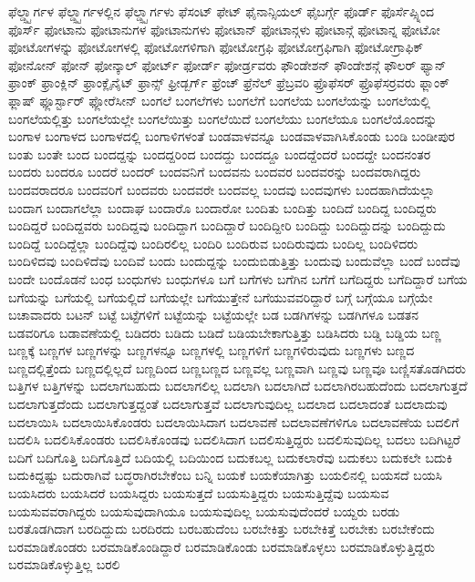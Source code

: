 {ಫೆಲ್ಡ್ಸ್ಟಾರ್ಗಳ
ಫೆಲ್ಡ್ಸ್ಟಾರ್ಗಳಲ್ಲಿನ
ಫೆಲ್ಡ್ಸ್ಟಾರ್ಗಳು
ಫೆಸಂಟ್
ಫೇಟ್
ಫೈನಾನ್ಸಿಯಲ್
ಫೈಬರ್ಗ್ಗೆ
ಫೊರ್ಡ್
ಫೊರ್ಸೆಪ್ಸ್ನಿಂದ
ಫೊರ್ಸ್
ಫೋಟಾನು
ಫೋಟಾನುಗಳ
ಫೋಟಾನುಗಳು
ಫೋಟಾನ್
ಫೋಟಾನ್ಗಳು
ಫೋಟಾನ್ಗೆ
ಫೋಟಾನ್ನ
ಫೋಟೋ
ಫೋಟೋಗಳನ್ನು
ಫೋಟೋಗಳಲ್ಲಿ
ಫೋಟೋಗಳಿಗಾಗಿ
ಫೋಟೋಗ್ರಫಿ
ಫೋಟೋಗ್ರಫಿಗಾಗಿ
ಫೋಟೋಗ್ರಾಫಿಕ್
ಫೋನೋನ್
ಫೋನ್
ಫೋನ್ಕಾಲ್
ಫೋರ್ಟ್
ಫೋರ್ಡ್
ಫೋರ್ಡ್ರವರು
ಫೌಂಡೇಶನ್
ಫೌಂಡೇಶನ್ಗೆ
ಫೌಲರ್
ಫ್ಯಾನ್
ಫ್ರಾಂಕ್
ಫ್ರಾಂಕ್ಲಿನ್
ಫ್ರಾಂಕ್ಲೈನೈಟ್
ಫ್ರಾನ್ಸ್
ಫ್ರೀಡ್ಬರ್ಗ್
ಫ್ರೆಂಚ್
ಫ್ರೆನೆಲ್
ಫ್ರೆಬ್ರವರಿ
ಫ್ರೊಫೆಸರ್
ಫ್ರೊಫೆಸರ್ರವರು
ಫ್ಲಾಂಕ್
ಫ್ಲಾಷ್
ಫ್ಲೂರ್ಸ್ಟಾರ್
ಫ್ಲೋರೆಸೀನ್
ಬಂಗಲೆ
ಬಂಗಲೆಗಳು
ಬಂಗಲೆಗೆ
ಬಂಗಲೆಯ
ಬಂಗಲೆಯನ್ನು
ಬಂಗಲೆಯಲ್ಲಿ
ಬಂಗಲೆಯಲ್ಲಿತ್ತು
ಬಂಗಲೆಯಲ್ಲೇ
ಬಂಗಲೆಯಿತ್ತು
ಬಂಗಲೆಯಿದೆ
ಬಂಗಲೆಯು
ಬಂಗಲೆಯೂ
ಬಂಗಲೆಯೊಂದನ್ನು
ಬಂಗಾಳ
ಬಂಗಾಳದ
ಬಂಗಾಳದಲ್ಲಿ
ಬಂಗಾಳಿಗಳಂತೆ
ಬಂಡವಾಳವನ್ನೂ
ಬಂಡವಾಳವಾಗಿಸಿಕೊಂಡು
ಬಂಡಿ
ಬಂಡೀಪುರ
ಬಂತು
ಬಂತೇ
ಬಂದ
ಬಂದದ್ದನ್ನು
ಬಂದದ್ದರಿಂದ
ಬಂದದ್ದು
ಬಂದದ್ದೂ
ಬಂದದ್ದೆಂದರೆ
ಬಂದದ್ದೇ
ಬಂದನಂತರ
ಬಂದರು
ಬಂದರೂ
ಬಂದರೆ
ಬಂದರ್
ಬಂದವನಿಗೆ
ಬಂದವನು
ಬಂದವರ
ಬಂದವರನ್ನು
ಬಂದವರಾಗಿದ್ದರು
ಬಂದವರಾದರೂ
ಬಂದವರಿಗೆ
ಬಂದವರು
ಬಂದವರೇ
ಬಂದವಲ್ಲ
ಬಂದವು
ಬಂದವುಗಳು
ಬಂದಹಾಗಿದೆಯಲ್ಲಾ
ಬಂದಾಗ
ಬಂದಾಗಲೆಲ್ಲಾ
ಬಂದಾಘ
ಬಂದಾರೊ
ಬಂದಾರೋ
ಬಂದಿತು
ಬಂದಿತ್ತು
ಬಂದಿದೆ
ಬಂದಿದ್ದ
ಬಂದಿದ್ದರು
ಬಂದಿದ್ದರೆ
ಬಂದಿದ್ದವರು
ಬಂದಿದ್ದವು
ಬಂದಿದ್ದಾಗ
ಬಂದಿದ್ದಾರೆ
ಬಂದಿದ್ದೀರಿ
ಬಂದಿದ್ದು
ಬಂದಿದ್ದುದನ್ನು
ಬಂದಿದ್ದುದು
ಬಂದಿದ್ದೆ
ಬಂದಿದ್ದೆಲ್ಲಾ
ಬಂದಿದ್ದೆವು
ಬಂದಿರಲಿಲ್ಲ
ಬಂದಿರಿ
ಬಂದಿರುವ
ಬಂದಿರುವುದು
ಬಂದಿಲ್ಲ
ಬಂದಿಳಿದರು
ಬಂದಿಳಿದವು
ಬಂದಿಳಿದೆವು
ಬಂದಿವೆ
ಬಂದು
ಬಂದುದ್ದನ್ನು
ಬಂದುಬಿಡುತ್ತಿತ್ತು
ಬಂದುವು
ಬಂದುವೆಲ್ಲಾ
ಬಂದೆ
ಬಂದೆವು
ಬಂದೇ
ಬಂದೊಡನೆ
ಬಂಧ
ಬಂಧುಗಳು
ಬಂಧುಗಳೂ
ಬಗೆ
ಬಗೆಗಳು
ಬಗೆಗಿನ
ಬಗೆಗೆ
ಬಗೆದಿದ್ದರು
ಬಗೆದಿದ್ದಾರೆ
ಬಗೆಯ
ಬಗೆಯನ್ನು
ಬಗೆಯಲ್ಲಿ
ಬಗೆಯಲ್ಲಿದೆ
ಬಗೆಯಲ್ಲೇ
ಬಗೆಯುತ್ತೇನೆ
ಬಗೆಯುವವರಿದ್ದಾರೆ
ಬಗ್ಗೆ
ಬಗ್ಗೆಯೂ
ಬಗ್ಗೆಯೇ
ಬಚಾವಾದರು
ಬಟನ್
ಬಟ್ಟೆ
ಬಟ್ಟೆಗಳಿಗೆ
ಬಟ್ಟೆಯನ್ನು
ಬಟ್ಟೆಯಲ್ಲೇ
ಬಡ
ಬಡಗಿಗಳನ್ನು
ಬಡಗಿಗಳೂ
ಬಡತನ
ಬಡವರಿಗೂ
ಬಡಾವಣೆಯಲ್ಲಿ
ಬಡಿದರು
ಬಡಿದು
ಬಡಿದೆ
ಬಡಿಯಬೇಕಾಗುತ್ತಿತ್ತು
ಬಡಿಸಿದರು
ಬಡ್ಡಿ
ಬಡ್ಡಿಯ
ಬಣ್ಣ
ಬಣ್ಣಕ್ಕೆ
ಬಣ್ಣಗಳ
ಬಣ್ಣಗಳನ್ನು
ಬಣ್ಣಗಳನ್ನೂ
ಬಣ್ಣಗಳಲ್ಲಿ
ಬಣ್ಣಗಳಿಗೆ
ಬಣ್ಣಗಳಿರುವುದು
ಬಣ್ಣಗಳು
ಬಣ್ಣದ
ಬಣ್ಣದಲ್ಲಿತ್ತೆಂದು
ಬಣ್ಣದಲ್ಲಿಲ್ಲದೆ
ಬಣ್ಣದಿಂದ
ಬಣ್ಣಬಣ್ಣದ
ಬಣ್ಣವಲ್ಲ
ಬಣ್ಣವಾಗಿ
ಬಣ್ಣವು
ಬಣ್ಣವೂ
ಬಣ್ಣಿಸತೊಡಗಿದರು
ಬತ್ತಿಗಳ
ಬತ್ತಿಗಳನ್ನು
ಬದಲಾಗಬಹುದು
ಬದಲಾಗಲಿಲ್ಲ
ಬದಲಾಗಿ
ಬದಲಾಗಿದೆ
ಬದಲಾಗಿರಬಹುದೆಂದು
ಬದಲಾಗುತ್ತದೆ
ಬದಲಾಗುತ್ತದೆಂದು
ಬದಲಾಗುತ್ತದ್ದಂತೆ
ಬದಲಾಗುತ್ತವೆ
ಬದಲಾಗುವುದಿಲ್ಲ
ಬದಲಾದ
ಬದಲಾದಂತೆ
ಬದಲಾದುವು
ಬದಲಾಯಿಸಿ
ಬದಲಾಯಿಸಿಕೊಂಡರು
ಬದಲಾಯಿಸಿದಾಗ
ಬದಲಾವಣೆ
ಬದಲಾವಣೆಗಳಿಗೂ
ಬದಲಾವಣೆಯ
ಬದಲಿಗೆ
ಬದಲಿಸಿ
ಬದಲಿಸಿಕೊಂಡರು
ಬದಲಿಸಿಕೊಂಡವು
ಬದಲಿಸಿದಾಗ
ಬದಲಿಸುತ್ತಿದ್ದರು
ಬದಲಿಸುವುದಿಲ್ಲ
ಬದಲು
ಬದಿಗಿಟ್ಟರೆ
ಬದಿಗೆ
ಬದಿಗೊತ್ತಿ
ಬದಿಗೊತ್ತಿದೆ
ಬದಿಯಲ್ಲಿ
ಬದಿಯಿಂದ
ಬದುಕಬಲ್ಲ
ಬದುಕಲಾರೆವು
ಬದುಕಲು
ಬದುಕಲೇ
ಬದುಕಿ
ಬದುಕಿದ್ದಷ್ಟು
ಬದುರಾಗಿವೆ
ಬದ್ಧರಾಗಿರಬೇಕೆಂಬ
ಬನ್ನಿ
ಬಯಕೆ
ಬಯಕೆಯಾಗಿತ್ತು
ಬಯಲಿನಲ್ಲಿ
ಬಯಸದೆ
ಬಯಸಿ
ಬಯಸಿದರು
ಬಯಸಿದರೆ
ಬಯಸಿದ್ದರು
ಬಯಸುತ್ತದೆ
ಬಯಸುತ್ತಿದ್ದರು
ಬಯಸುತ್ತಿದ್ದೆವು
ಬಯಸುವ
ಬಯಸುವವರಾಗಿದ್ದರು
ಬಯಸುವುದಾಗಿಯೂ
ಬಯಸುವುದಿಲ್ಲ
ಬಯಸುವುದೆಂದರೆ
ಬಯ್ದರು
ಬರಡು
ಬರತೊಡಗಿದಾಗ
ಬರದಿದ್ದುದು
ಬರದಿರದು
ಬರಬಹುದೆಂಬ
ಬರಬೇಕಿತ್ತು
ಬರಬೇಕಿತ್ತೆ
ಬರಬೇಕು
ಬರಬೇಕೆಂದು
ಬರಮಾಡಿಕೊಂಡರು
ಬರಮಾಡಿಕೊಂಡಿದ್ದಾರೆ
ಬರಮಾಡಿಕೊಂಡು
ಬರಮಾಡಿಕೊಳ್ಳಲು
ಬರಮಾಡಿಕೊಳ್ಳುತ್ತಿದ್ದರು
ಬರಮಾಡಿಕೊಳ್ಳುತ್ತಿಲ್ಲ
ಬರಲಿ
}
